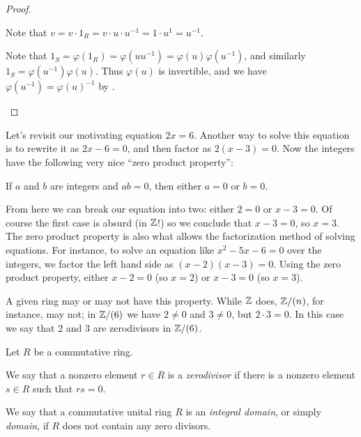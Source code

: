 \begin{proof}
\begin{inlineproplist}
\item Note that \(v = v \cdot 1_R = v \cdot u \cdot u^{-1} = 1 \cdot u^{1} = u^{-1}\).
\item Note that \(1_S = \varphi(1_R) = \varphi(uu^{-1}) = \varphi(u)\varphi(u^{-1})\), and similarly \(1_S = \varphi(u^{-1})\varphi(u)\). Thus \(\varphi(u)\) is invertible, and we have \(\varphi(u^{-1}) = \varphi(u)^{-1}\) by .
\end{inlineproplist}
\end{proof}

Let's revisit our motivating equation \(2x = 6\). Another way to solve this equation is to rewrite it as \(2x - 6 = 0\), and then factor as \(2(x-3) = 0\). Now the integers have the following very nice ``zero product property'':
\begin{center}
If \(a\) and \(b\) are integers and \(ab = 0\), then either \(a = 0\) or \(b = 0\).
\end{center}
From here we can break our equation into two: either \(2 = 0\) or \(x - 3 = 0\). Of course the first case is absurd (in \(\mathbb{Z}\)!) so we conclude that \(x - 3 = 0\), so \(x = 3\). The zero product property is also what allows the factorization method of solving equations. For instance, to solve an equation like \(x^2 - 5x - 6 = 0\) over the integers, we factor the left hand side as \((x-2)(x-3) = 0\). Using the zero product property, either \(x-2 = 0\) (so \(x = 2\)) or \(x-3 = 0\) (so \(x = 3\)).

A given ring may or may not have this property. While \(\mathbb{Z}\) does, \(\mathbb{Z}/(n)\), for instance, may not; in \(\mathbb{Z}/(6)\) we have \(2 \neq 0\) and \(3 \neq 0\), but \(2 \cdot 3 = 0\). In this case we say that \(2\) and \(3\) are zerodivisors in \(\mathbb{Z}/(6)\).

\begin{dfn}[Zerodivisor] \label{dfn:zerodivisor-domain}
Let \(R\) be a commutative ring.
\begin{proplist}
\item We say that a nonzero element \(r \in R\) is a \emph{zerodivisor} if there is a nonzero element \(s \in R\) such that \(rs = 0\). 
\item We say that a commutative unital ring \(R\) is an \emph{integral domain}, or simply \emph{domain}, if \(R\) does not contain any zero divisors. 
\end{proplist}
\end{dfn}

